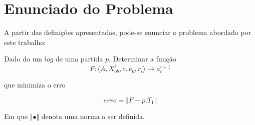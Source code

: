\section{Enunciado do Problema}

A partir das definições apresentadas, pode-se enunciar o problema 
abordado por este trabalho:

Dado do um $log$ de uma partida $p$. Determinar a função
\[
F:\langle A, X_{ob}^{i}, e, e_b, r_i \rangle \longrightarrow a_c^{i+1}
\]

que minimiza o erro

\[
 erro = \Vert F - p.T_1 \Vert
\]

Em que $\Vert \bullet \Vert$ denota uma norma a ser definida.
